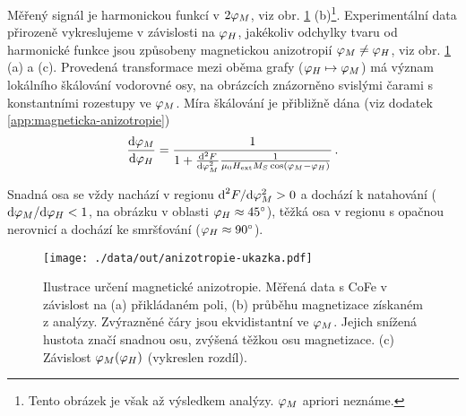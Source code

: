 Měřený signál je harmonickou funkcí v $2\varphi_M$, viz obr. \ref{fig:anizotropie-vizualni} (b)\footnote{Tento obrázek je však až výsledkem analýzy. $\varphi_M$ apriori neznáme.}.
Experimentální data přirozeně vykreslujeme v závislosti na $\varphi_H$, jakékoliv odchylky tvaru od harmonické funkce jsou způsobeny magnetickou anizotropií $\varphi_M\neq\varphi_H$, viz obr. \ref{fig:anizotropie-vizualni} (a) a (c).
Provedená transformace mezi oběma grafy ($\varphi_H \mapsto \varphi_M$) má význam lokálního škálování vodorovné osy, na obrázcích znázorněno svislými čarami s konstantními rozestupy ve $\varphi_M$.
Míra škálování je přibližně dána (viz dodatek \ref{app:magneticka-anizotropie})
\begin{equation}
    \frac{\textrm{d}\varphi_M}{\textrm{d}\varphi_H} = \frac{1}{1+\frac{\textrm{d}^2 F}{\textrm{d}\varphi_M^2}\frac{1}{\mu_0 H_\textrm{ext} M_S \cos(\varphi_M-\varphi_H)}} \,.
\end{equation}

Snadná osa se vždy nachází v regionu $\textrm{d}^2F/\textrm{d}\varphi_M^2 > 0$ a dochází k natahování ($\textrm{d}\varphi_M/\textrm{d}\varphi_H < 1$, na obrázku v oblasti $\varphi_H\approx\SI{45}{\degree}$), těžká osa v regionu s opačnou nerovnicí a dochází ke smršťování ($\varphi_H\approx\SI{90}{\degree}$).

\begin{figure}[htbp]
    \centering
    \texttt{[image: ./data/out/anizotropie-ukazka.pdf]}
    \caption{Ilustrace určení magnetické anizotropie. Měřená data s CoFe v závislost na (a) přikládaném poli, (b) průběhu magnetizace získaném z analýzy.
    Zvýrazněné čáry jsou ekvidistantní ve $\varphi_M$. Jejich snížená hustota značí snadnou osu, zvýšená těžkou osu magnetizace. (c) Závislost $\varphi_M(\varphi_H)$ (vykreslen rozdíl).}
    \label{fig:anizotropie-vizualni}
\end{figure}


